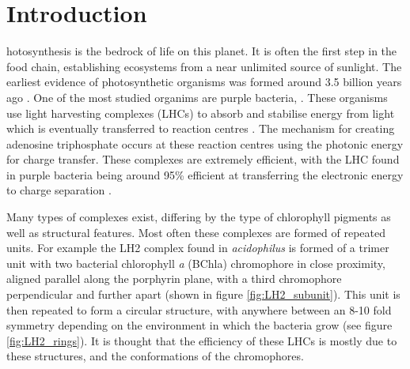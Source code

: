 %
%
\chapter{Introduction}
\label{chap:intro}

hotosynthesis is the bedrock of life on this planet. It is often the 
first step in the food chain, establishing ecosystems from a near unlimited source 
of sunlight. The earliest evidence of photosynthetic organisms was formed around
3.5 billion years ago \cite{Blankenship2010}. One of the most studied organims are
purple bacteria, \cite{Cogdell2021}. These organisms use light harvesting complexes 
(LHCs) to absorb and stabilise energy from light which is eventually transferred 
to reaction centres \cite{Klamt2008}. The mechanism for creating adenosine triphosphate
occurs at these reaction centres using the photonic energy for charge transfer.
These complexes are extremely efficient, with the LHC found in purple bacteria being
around 95\% efficient at transferring the electronic energy to charge separation \cite{Tretiak2000}.

Many types of complexes exist, differing by the type of chlorophyll pigments as 
well as structural features. Most often these complexes are formed of repeated units.
For example the LH2 complex found in \emph{acidophilus} is formed of a trimer unit
with two bacterial chlorophyll \emph{a} (BChla) chromophore in close proximity, 
aligned parallel along the porphyrin plane, with a third chromophore perpendicular
and further apart (shown in figure \ref{fig:LH2_subunit}). This unit is then repeated
to form a circular structure, with anywhere between an 8-10 fold symmetry depending 
on the environment in which the bacteria grow (see figure \ref{fig:LH2_rings}). 
It is thought that the efficiency of these LHCs is mostly due to these structures,
and the conformations of the chromophores.

